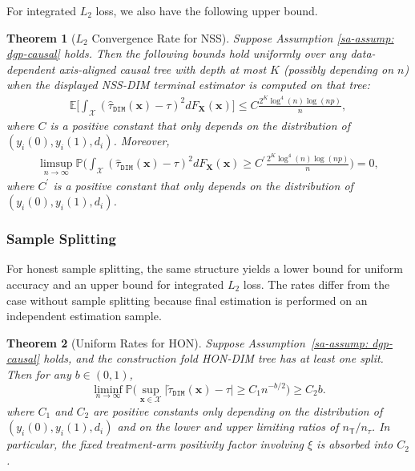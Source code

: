 \documentclass[10pt]{article}
\def\treeT{\mathsf{T}}
\def\bx{\mathbf{x}}
\def\bX{\mathbf{X}}
\def\X{\mathcal{X}}
\def\E{\mathbb{E}}
\def\P{\mathbb{P}}
\newtheorem{theorem}{Theorem}%
\theoremstyle{definition}
\theoremstyle{remark}
\begin{document}
For integrated $L_2$ loss, we also have the following upper bound.

\begin{theorem}[$L_2$ Convergence Rate for NSS]\label{sa-thm: L2 consistency NSS reg}
Suppose Assumption \ref{sa-assump: dgp-causal} holds. Then the following bounds hold uniformly over any data-dependent axis-aligned causal tree with depth at most $K$ (possibly depending on $n$) when the displayed NSS-DIM terminal estimator is computed on that tree:
\begin{align*}
    \E \bigg[ \int_{\X} (\hat\tau_{\mathtt{DIM}}(\bx) - \tau)^2 dF_{\bX}(\bx)\bigg] \leq C \frac{2^K \log^4(n) \log(np)}{n},
\end{align*}
where $C$ is a positive constant that only depends on the distribution of $(y_i(0),y_i(1),d_i)$. Moreover,
\begin{align*}
    \limsup_{n \to \infty} \P \bigg( \int_{\X} (\hat\tau_{\mathtt{DIM}}(\bx) - \tau)^2 dF_{\bX}(\bx) \geq C^{\prime} \frac{2^K \log^4(n) \log(np)}{n} \bigg) = 0,
\end{align*}
where $C^{\prime}$ is a positive constant that only depends on the distribution of $(y_i(0),y_i(1),d_i)$.
\end{theorem}

\subsubsection{Sample Splitting}

For honest sample splitting, the same structure yields a lower bound for uniform accuracy and an upper bound for integrated $L_2$ loss. The rates differ from the case without sample splitting because final estimation is performed on an independent estimation sample.

\begin{theorem}[Uniform Rates for HON]\label{sa-thm: honest output reg}
Suppose Assumption~\ref{sa-assump: dgp-causal} holds, and the construction fold HON-DIM tree has at least one split. Then for any $b \in (0, 1) $,
\begin{equation*}
    \liminf_{n\to\infty} \mathbb{P}\Bigg(\sup_{\bx\in\mathcal{X}}|\check\tau_{\mathtt{DIM}}(\bx) - \tau| \geq C_1 n^{-b/2} \Bigg) \geq C_2 b.
\end{equation*}
where $C_1$ and $C_2$ are positive constants only depending on the distribution
of $(y_i(0),y_i(1),d_i)$ and on the lower and upper limiting ratios of
$n_{\treeT}/n_{\tau}$. In particular, the fixed treatment-arm positivity factor
involving $\xi$ is absorbed into $C_2$.
\end{theorem}
\end{document}
